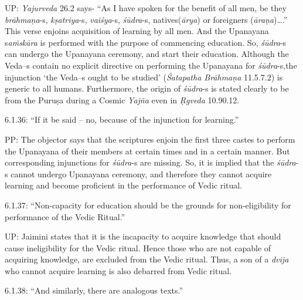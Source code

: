 UP: \textit{Yajurveda} 26.2 says- “As I have spoken for the benefit of all men, be they \textit{brāhmaṇa}-s, \textit{kṣatriya}-s, \textit{vaiśya}-s, \textit{śūdra}-s, natives(\textit{ārya}) or foreigners (\textit{āraṇa})….” This verse enjoins acquisition of learning by all men. And the Upanayana s\textit{aṁskāra} is performed with the purpose of commencing education. So, \textit{śūdra}-s can undergo the Upanayana ceremony, and start their education. Although the Veda--s contain no explicit directive on performing the Upanayana for \textit{śūdra}-s,\break the injunction ‘the Veda--s ought to be studied’ (\textit{Śatapatha Brāhmaṇa} 11.5.7.2) is generic to all humans. Furthermore, the origin of \textit{śūdra}-s is stated clearly to be from the Puruṣa during a Cosmic \textit{Yajña} even in \textit{Ṛgveda} 10.90.12.

\newpage

6.1.36: “If it be said – no, because of the injunction for learning.”

PP: The objector says that the scriptures enjoin the first three castes to perform the Upanayana of their members at certain times and in a certain manner. But corresponding injunctions for \textit{śūdra}-s are missing. So, it is implied that the \textit{śūdra}-s cannot undergo Upanayana ceremony, and therefore they cannot acquire learning and become proficient in the performance of Vedic ritual.

6.1.37: “Non-capacity for education should be the grounds for non-eligibility for performance of the Vedic Ritual.”

UP: Jaimini states that it is the incapacity to acquire knowledge that should cause ineligibility for the Vedic ritual. Hence those who are not capable of acquiring knowledge, are excluded from the Vedic ritual. Thus, a son of a \textit{dvija }who cannot acquire learning is also debarred from Vedic ritual.

6.1.38: “And similarly, there are analogous texts.”

